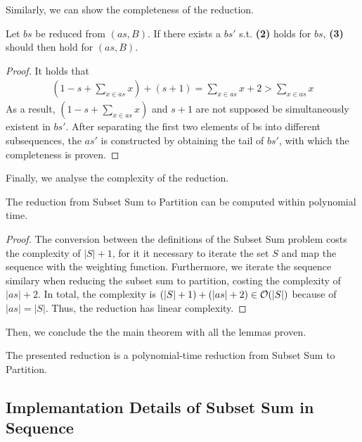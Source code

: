 Similarly, we can show the completeness of the reduction.
\begin{lemma}[Completeness]
    Let $bs$ be reduced from $(as, B)$. If there exists a $bs'$ s.t. \textbf{(2)} holds for $bs$, 
    \textbf{(3)} should then hold for $(as, B)$.
\end{lemma}
\begin{proof}
    It holds that
\begin{align*}
    (1 - s + \sum_{x \in as} x) + (s + 1) = \sum_{x \in as} x + 2 > \sum_{x \in as} x
\end{align*}
As a result, $(1 - s + \sum_{x \in as} x)$ and $s + 1$ are not supposed be simultaneously existent in $bs'$. 
After separating the first two elements of bs into different subsequences, the $as'$ is constructed 
by obtaining the tail of $bs'$, with which the completeness is proven.
\end{proof} 
Finally, we analyse the complexity of the reduction.
\begin{lemma}
    The reduction from Subset Sum to Partition can be computed within polynomial time.
\end{lemma}
\begin{proof}
The conversion between the definitions of the Subset Sum problem costs the complexity of $|S| + 1$,
for it it necessary to iterate the set $S$ and map the sequence with the weighting function. Furthermore, we iterate the sequence similary when reducing the subset sum to partition, costing
the complexity of $|as| + 2$. In total, the complexity is $(|S| + 1) + (|as| + 2) \in \mathcal{O}({|S|})$  because of $|as| = |S|$.
Thus, the reduction has linear complexity.
\end{proof}
Then, we conclude the the main theorem with all the lemmas proven.
\begin{theorem}
    The presented reduction is a polynomial-time reduction from Subset Sum to Partition.
\end{theorem}
\subsection{Implemantation Details of Subset Sum in Sequence}
